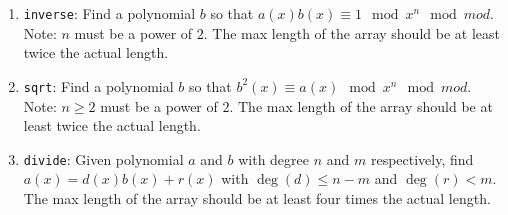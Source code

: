 \begin{enumerate}
\item \texttt{inverse}: Find a polynomial $b$ so that $a(x)b(x)\equiv 1\mod x^n\mod mod$.
Note: $n$ must be a power of $2$. The max length of the array should be at least twice the actual length. 
\item \texttt{sqrt}: Find a polynomial $b$ so that $b^2(x)\equiv a(x)\mod x^n\mod mod$. 
Note: $n\ge 2$ must be a power of $2$. The max length of the array should be at least twice the actual length. 
\item \texttt{divide}: Given polynomial $a$ and $b$ with degree $n$ and $m$ respectively, find $a(x)=d(x)b(x)+r(x)$ with $\operatorname{deg}(d)\le n-m$ and $\operatorname{deg}(r)<m$. The max length of the array should be at least four times the actual length. 
\end{enumerate}


